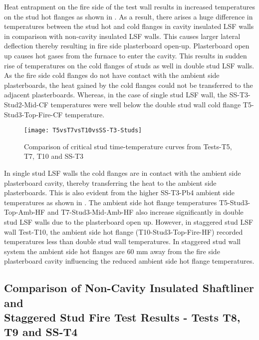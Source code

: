 Heat entrapment on the fire side of the test wall results in increased temperatures on the stud hot flanges as shown in . As a result, there arises a huge difference in temperatures between the stud hot and cold flanges in cavity insulated LSF walls in comparison with non-cavity insulated LSF walls. This causes larger lateral deflection thereby resulting in fire side plasterboard open-up. Plasterboard open up causes hot gases from the furnace to enter the cavity. This results in sudden rise of temperatures on the cold flanges of studs as well in double stud LSF walls. As the fire side cold flanges do not have contact with the ambient side plasterboards, the heat gained by the cold flanges could not be transferred to the adjacent plasterboards. Whereas, in the case of single stud LSF wall, the SS-T3-Stud2-Mid-CF temperatures were well below the double stud wall cold flange T5-Stud3-Top-Fire-CF temperature. 
\begin{figure}[htbp]
	\centering
		\texttt{[image: T5vsT7vsT10vsSS-T3-Studs]}  
	\caption{Comparison of critical stud time-temperature curves from Tests-T5, T7, T10 and SS-T3}
	\label{fig:T5vsT7vsT10vsSS-T3-Studs}
\end{figure}

In single stud LSF walls the cold flanges are in contact with the ambient side plasterboard cavity, thereby transferring the heat to the ambient side plasterboards. This is also evident from the higher SS-T3-Pb4 ambient side temperatures as shown in . The ambient side hot flange temperatures T5-Stud3-Top-Amb-HF and T7-Stud3-Mid-Amb-HF also increase significantly in double stud LSF walls due to the plasterboard open up. However, in staggered stud LSF wall Test-T10, the ambient side hot flange (T10-Stud3-Top-Fire-HF) recorded temperatures less than double stud wall temperatures. In staggered stud wall system the ambient side hot flanges are 60 mm away from the fire side plasterboard cavity influencing the reduced ambient side hot flange temperatures.      

\subsection[Comparison of Non-Cavity Insulated Shaftliner and Staggered Stud Fire Test Results - Tests T8, T9 and SS-T4]{Comparison of Non-Cavity Insulated Shaftliner and\\Staggered Stud Fire Test Results - Tests T8, T9 and SS-T4}

